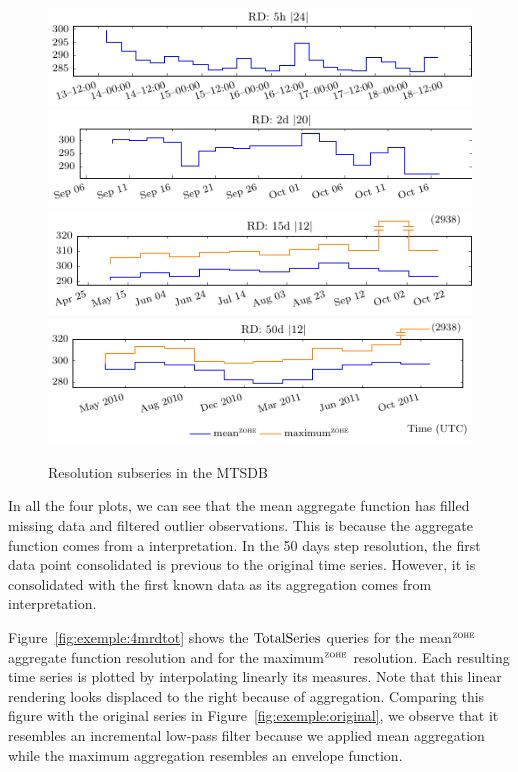 \begin{figure}[tp]
  \centering
  \includegraphics{fig_exemple_4mrd1.pdf}
  \includegraphics{fig_exemple_4mrd2.pdf}
  \includegraphics{fig_exemple_4mrd3.pdf}
  \includegraphics{fig_exemple_4mrd4.pdf}
  \caption{Resolution subseries in the MTSDB}
  \label{fig:exemple:4mrd}
\end{figure}

In all the four plots, we can see that the mean aggregate function has
filled missing data and filtered outlier observations. This is
because the aggregate function comes from a \zohe{} interpretation.
In the 50 days step resolution, the first data point consolidated is
previous to the original time series. However, it is consolidated with
the first known data as its aggregation comes from \zohe{}
interpretation.

Figure~\ref{fig:exemple:4mrdtot} shows the $\operatorname{TotalSeries}$ queries for
the mean$^{\zohe}$ aggregate function resolution and for the
maximum$^{\zohe}$ resolution.  Each resulting time series is plotted
by interpolating linearly its measures. Note that this linear
rendering looks displaced to the right because of \zohe{} aggregation.
Comparing this figure with the original series in
Figure~\ref{fig:exemple:original}, we observe that it resembles an
incremental low-pass filter because we applied mean aggregation while
the maximum aggregation resembles an envelope function.

